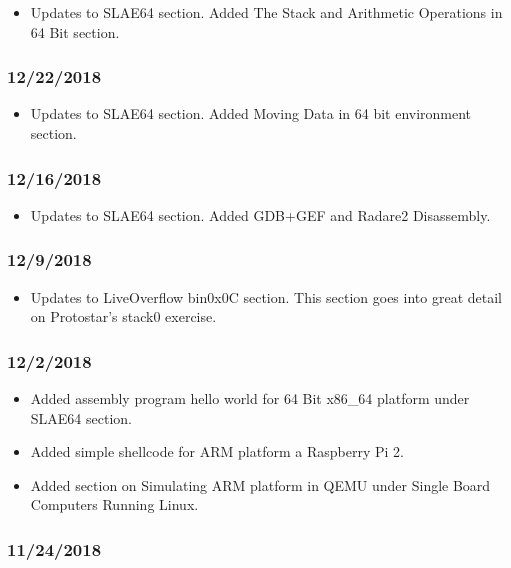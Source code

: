\begin{itemize}
\item Updates to SLAE64 section. Added The Stack and Arithmetic Operations in 64 Bit section.
\end{itemize}

\subsubsection{12/22/2018}

\begin{itemize}
\item Updates to SLAE64 section. Added Moving Data in 64 bit environment section.
\end{itemize}

\subsubsection{12/16/2018}

\begin{itemize}
\item Updates to SLAE64 section. Added GDB+GEF and Radare2 Disassembly.
\end{itemize}

\subsubsection{12/9/2018}

\begin{itemize}
\item Updates to LiveOverflow bin0x0C section. This section goes into great detail on Protostar's stack0 exercise.
\end{itemize}

\subsubsection{12/2/2018}

\begin{itemize}
\item Added assembly program hello world for 64 Bit x86\_64 platform under SLAE64 section.
\item Added simple shellcode for ARM platform a Raspberry Pi 2.
\item Added section on Simulating ARM platform in QEMU under Single Board Computers Running Linux.
\end{itemize}

\subsubsection{11/24/2018}

